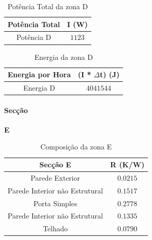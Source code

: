 \documentclass[12pt, a4paper]{article}
\begin{document}
\vspace{30mm}

\begin{table}[htpb]
	\begin{center}
		\begin{tabular}{c c}
			\toprule
			Potência  Total 										 & 	I (W) \\
			\midrule
			 Potência D		               	     & $1123$	 \\
			\bottomrule
		\end{tabular}
	\end{center}
	\caption{Potência Total da zona D}\label{tab:2seccaoDpotT}
\end{table}

\vspace{30mm}

\begin{table}[htpb]
	\begin{center}
		\begin{tabular}{c c}
			\toprule
			Energia por Hora 								 & 	(I * $\Delta$t) (J) \\
			\midrule
			Energia D 						               	     & $4041544$	 \\
			\bottomrule
		\end{tabular}
	\end{center}
	\caption{Energia da zona D}\label{tab:3seccaoDpotT}
\end{table}

\pagebreak
\paragraph{Secção}
\textbf{E}

\begin{table}[htpb]
	\begin{center}
		\begin{tabular}{c c}
			\toprule
			Secção E  													 & 	R (K/W) \\
			\midrule
			Parede Exterior                  				         & $0.0215$		 \\
			\cline{1-1}
			Parede Interior n\~ao Estrutural               & $0.1517$		 \\
			Porta Simples                 							 & $0.2778$		 \\
			\cline{1-1}
			Parede Interior n\~ao Estrutural               & $0.1335$		 \\
			\cline{1-1}
			Telhado                   									 & $0.0790$		 \\
			\bottomrule
		\end{tabular}
	\end{center}
	\caption{Composição da zona E}\label{tab:seccaoE}
\end{table}
\end{document}
